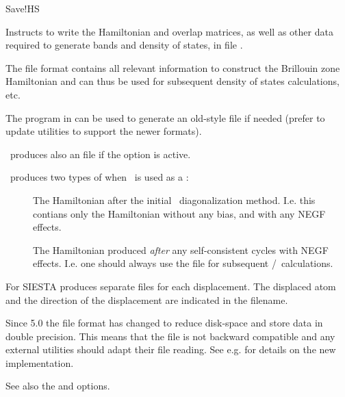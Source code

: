   \begin{fdflogicalT}{Save!HS}

    Instructs to write the Hamiltonian and overlap matrices, as well as
    other data required to generate bands and density of states, in file
    .

    The  file format contains all relevant information to construct
    the Brillouin zone Hamiltonian and can thus be used for subsequent density
    of states calculations, etc.

    The program  in  can be used to
    generate an old-style  file if needed (prefer to update utilities
    to support the newer formats).

    \siesta\ produces also an  file if the  option
    is active.  

    \siesta\ produces two types of  when \tsiesta\ is used as a
    :
    \begin{description}
      \item[] The Hamiltonian after the initial \siesta\ diagonalization
        method. I.e. this contians only the Hamiltonian without any bias, and with any
        NEGF effects.

      \item[] The Hamiltonian produced \emph{after} any self-consistent
        cycles with NEGF effects. I.e. one should always use the  file for
        subsequent \tsiesta/\tbtrans\ calculations.
    \end{description}

    For  SIESTA produces separate  files for
    each displacement. The displaced atom and the direction of the displacement
    are indicated in the filename.

    \note Since 5.0 the  file format has changed to reduce
    disk-space and store data in double precision. This means that the
    file is not backward compatible and any external utilities should
    adapt their  file reading. See e.g. 
    for details on the new implementation.

    See also the  and 
    options.

  \end{fdflogicalT}

